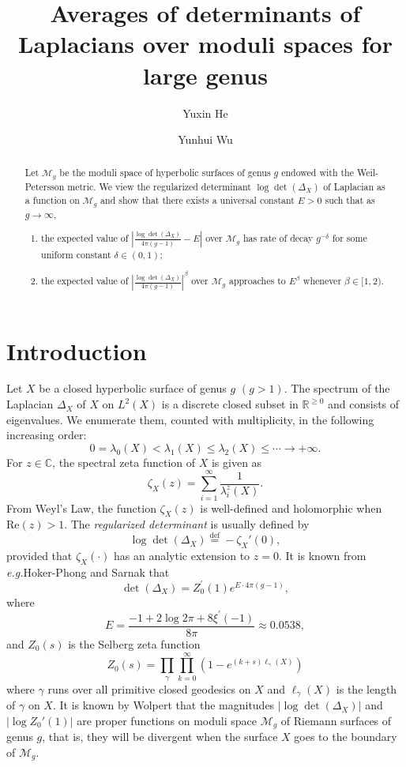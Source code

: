 \documentclass[11pt]{amsart}
\title[Determinants of Laplacians]{Averages of determinants of Laplacians over moduli spaces for large genus}
\author{Yuxin He}
\author{Yunhui Wu}
\makeatletter
\newcommand{\sM}{\mathcal{M}}
\newcommand{\R}{\mathbb{R}}
\newcommand{\eg}{\textit{e.g.\@ }}
\theoremstyle{plain}
\theoremstyle{definition}
\theoremstyle{remark}
\makeatother
\begin{document}
\maketitle



\begin{abstract}
Let $\mathcal{M}_g$ be the moduli space of hyperbolic surfaces of genus $g$ endowed with the Weil-Petersson metric. We view the regularized determinant $\log \det(\Delta_{X})$ of Laplacian as a function on $\mathcal{M}_g$ and show that there exists a universal constant $E>0$ such that as $g\to \infty$,
\begin{enumerate}
\item the expected value of $\left|\frac{\log \det(\Delta_{X})}{4\pi(g-1)}-E \right|$ over $\mathcal{M}_g$ has rate of decay $g^{-\delta}$ for some uniform constant $\delta \in (0,1)$;
\item  the expected value of $\left|\frac{\log \det(\Delta_{X})}{4\pi(g-1)}\right|^\beta$ over $\mathcal{M}_g$ approaches to $E^\beta$ whenever $\beta \in [1,2)$.
\end{enumerate}
\end{abstract}




\section{Introduction}
Let $X$ be a closed hyperbolic surface of genus $g$ $(g>1)$. The spectrum of the Laplacian $\Delta_X$ of $X$ on $L^2(X)$ is a discrete closed subset in $\R^{\geq 0}$ and consists of eigenvalues. We enumerate them, counted with multiplicity, in the following increasing order:
\[0=\lambda_0(X)<\lambda_1(X)\leq \lambda_2(X) \leq \cdots \to +\infty.\]
For $z\in \mathbb{C}$, the spectral zeta function of $X$ is given as
\[\zeta_X(z)=\sum_{i=1}^\infty \frac{1}{\lambda_i^z(X)}.\]
From Weyl's Law, the function $\zeta_X(z)$ is well-defined and holomorphic when $\mathrm{Re}(z)>1$. The \emph{regularized determinant} is usually defined by
\[\log \det (\Delta_X)\overset{\text{def}}{=}-\zeta_X'(0),\]
provided that $\zeta_X(\cdot)$ has an analytic extension to $z=0$. It is known from \eg  Hoker-Phong \cite{HP86} and Sarnak \cite{sarnak1987determinants}  that 
 \begin{equation}\label{eq-det-zetaprime}
     \det (\Delta_X)=Z_0^\prime(1)e^{E\cdot 4\pi(g-1)},
 \end{equation}
where 
\[E=\frac{-1+2\log 2\pi+8\xi^\prime(-1)}{8\pi}\approx 0.0538,\]
and $Z_0(s)$ is the Selberg zeta function $$
Z_0(s)=\prod_\gamma\prod_{k=0}^\infty \left(1-e^{(k+s)\ell_\gamma(X)}\right)
$$
where $\gamma$ runs over all primitive closed geodesics on $X$ and $\ell_\gamma(X)$ is the length of $\gamma$ on $X$. It is known by Wolpert \cite{Wol87} that the magnitudes $\left| \log \det(\Delta_X) \right|$ and $\left| \log Z_0'(1) \right|$ are proper functions on moduli space $\sM_g$ of Riemann surfaces of genus $g$, that is, they will be divergent when the surface $X$ goes to the boundary of $\sM_g$.
\end{document}
